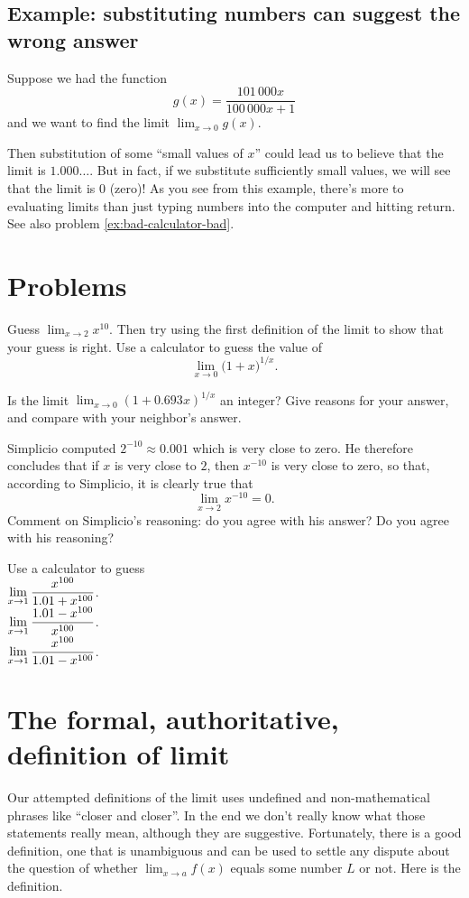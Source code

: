 \subsection{Example: substituting numbers can suggest the wrong answer} 
\label{ex:limit-by-sub-bad}
Suppose we had the function
\[
g(x) = \frac{101\,000x}{100\,000x+1}
\]
and we want to find the limit $\lim_{x\to0}g(x)$.

Then substitution of some ``small values of $x$'' could lead us to believe
that the limit is $1.000\ldots$.  But in fact, if we substitute sufficiently
small values, we will see that the limit is $0$ (zero)!
As you see from this example, there's more to evaluating limits
than just typing numbers into the computer and hitting return.  See
also problem \ref{ex:bad-calculator-bad}.
\section{Problems} 
\problemfont 
\begin{multicols}{2}
\problem Guess $\lim_{x\to 2} x^{10}$. 
Then try using the first definition of the limit to show that your
guess is right.
\problem Use a calculator to guess the value of 
\[
\lim_{x\to0} \bigl(1+x\bigr)^{1/x}.
\]

\problem Is the limit 
$\lim_{x\to0} (1+0.693x)^{1/x}$
an integer?  Give reasons for your answer, and compare with your
neighbor's answer.

\problem Simplicio computed $2^{-10} \approx 0.001$ which is very 
close to zero.  He therefore concludes that if $x$ is very close to
$2$, then $x^{-10}$ is very close to zero, so that, according to
Simplicio, it is clearly true that
\[
\lim_{x\to2} x^{-10} = 0.
\]
Comment on Simplicio's reasoning: do you agree with his answer?  Do
you agree with his reasoning?

\problem Use a calculator to guess\\[6pt] 

\subprob $\displaystyle\lim_{x\to1} \frac{x^{100}}{1.01+x^{100}}$.\\[6pt]

\subprob $\displaystyle\lim_{x\to1} \frac{1.01-x^{100}}{x^{100}}$.\\[6pt]

\subprob $\displaystyle\lim_{x\to1} \frac{x^{100}}{1.01-x^{100}}$.

\end{multicols}
\noproblemfont

\section{The formal, authoritative, definition of limit} 
\label{sec:formal-limit-def} Our attempted definitions of the limit
uses undefined and non-mathematical phrases like ``closer and closer''.
In the end we don't really know what those statements really mean, although they are
suggestive.  Fortunately, there is a good definition, one
that is unambiguous and can be used to settle any dispute about the
question of whether $\lim_{x\to a} f(x)$ equals some number $L$ or
not.  Here is the definition.  

